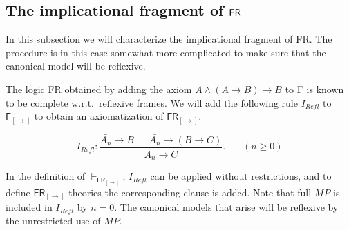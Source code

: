 \documentclass[12pt]{article}
\newtheorem{thm}{Theorem}[section]
\newtheorem{dfn}[thm]{Definition}
\begin{document}
\subsection{The implicational fragment of $ {\sf FR}  $}

In this subsection we will characterize the implicational fragment of {\sf FR}. The procedure is in this case somewhat more complicated to make sure that the canonical model will be reflexive.



The logic {\sf FR} obtained by adding the axiom $A\wedge(A\rightarrow B)\rightarrow B$ to {\sf F} is known to be complete w.r.t.\ reflexive frames. We will add the following rule $ I_{Refl} $ to $\mathsf{F_{[\rightarrow]}}$  to obtain an axiomatization of ${\mathsf{FR_{[\rightarrow]}}}$.

$$ I_{Refl}: \dfrac{\bar{A_{n}}\rightarrow B~~~~~~~ \bar{A_{n}}\rightarrow (B\rightarrow C)}{\bar{A_{n}}\rightarrow C}.~~~~~~~~(n\geq 0)$$

In the definition of $\vdash_\mathsf{FR_{[\rightarrow]}}$, $ I_{Refl} $ can be applied without restrictions, and to define $\mathsf{ FR}_{[\rightarrow]}$-theories the corresponding clause is added. Note that full $M\!P$ is included in $ I_{Refl} $ by $n=0$. The  canonical models that  arise will be reflexive by the unrestricted use of  $M\!P$.


\end{document}
